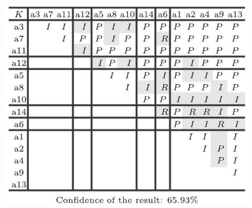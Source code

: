 \documentclass[10pt]{article}
\begin{document}
\includegraphics[max width=\textwidth, center]{2024_01_11_fda3c6ffd32dd805faacg-7(2)}
\end{document}
